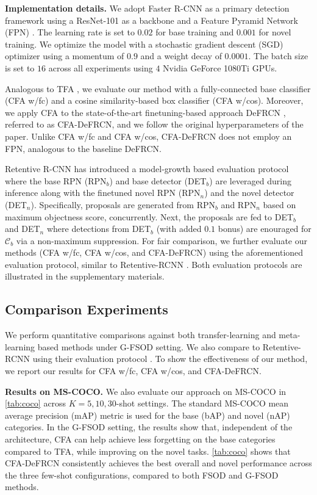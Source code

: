 \documentclass[10pt,twocolumn,letterpaper]{article}
\begin{document}
\textbf{Implementation details.} We adopt Faster R-CNN \cite{FasterR-CNN} as a primary detection framework using a ResNet-101 \cite{resnets} as a backbone and a Feature Pyramid Network (FPN) \cite{fpn}. The learning rate is set to $0.02$ for base training and $0.001$ for novel training.  We optimize the model with a stochastic gradient descent (SGD) optimizer using a momentum of $0.9$ and a weight decay of $0.0001$. The batch size is set to $16$ across all experiments using $4$ Nvidia GeForce 1080Ti GPUs. 

Analogous to TFA \cite{TFA}, we evaluate our method with a fully-connected base classifier (CFA w/fc) and a cosine similarity-based box classifier (CFA w/cos). Moreover, we apply CFA to the state-of-the-art finetuning-based approach DeFRCN \cite{defrcn}, referred to as CFA-DeFRCN, and we follow the original  hyperparameters of the paper. Unlike CFA w/fc and CFA w/cos, CFA-DeFRCN does not employ an FPN, analogous to the baseline DeFRCN. 

Retentive R-CNN \cite{gfsod} has introduced a model-growth based evaluation protocol where the base RPN (RPN$_{b}$) and base detector (DET$_{b}$) are leveraged during inference along with the finetuned novel RPN (RPN$_{n}$) and the novel detector (DET$_{n}$). Specifically, proposals are generated from RPN$_{b}$ and RPN$_{n}$ based on maximum objectness score, concurrently. Next, the proposals are fed to DET$_{b}$ and DET$_{n}$ where detections from DET$_{b}$ (with added $0.1$ bonus) are enouraged for $\mathcal{C}_b$ via a non-maximum suppression. For fair comparison, we further evaluate our methods (CFA w/fc, CFA w/cos, and CFA-DeFRCN) using the aforementioned evaluation protocol, similar to Retentive-RCNN \cite{gfsod}. Both evaluation protocols are illustrated in the supplementary materials.


\subsection{Comparison Experiments}

We perform quantitative comparisons against both transfer-learning \cite{TFA, MPSR, gfsod, defrcn} and meta-learning \cite{ONCE, MetaRCNN, FSRW, FsDetView} based methods under G-FSOD setting. We also compare to Retentive-RCNN using their evaluation protocol \cite{gfsod}. To show the effectiveness of our method, we report our results for CFA w/fc, CFA w/cos, and CFA-DeFRCN.  

\textbf{Results on MS-COCO.} We also evaluate our approach on MS-COCO in \cref{tab:coco} across $K=5,10,30$-shot settings. The standard MS-COCO mean average precision (mAP) metric is used for the base (bAP) and novel (nAP) categories. In the G-FSOD setting, the results show that, independent of the architecture, CFA can help achieve less forgetting on the base categories compared to TFA, while improving on the novel tasks. \cref{tab:coco} shows that CFA-DeFRCN consistently achieves the best overall and novel performance across the three few-shot configurations, compared to both FSOD and G-FSOD methods. 
\end{document}
